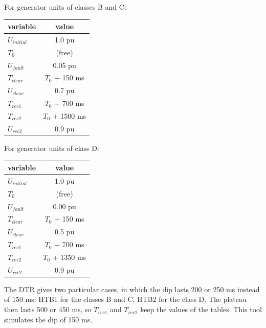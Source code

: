     For generator units of classes B and C:
    \begin{center}
        \begin{tabular}{lc}
            \toprule
            \textbf{variable} & \textbf{value} \\
            \midrule
            $U_{initial}$     & 1.0 pu                   \\
            $T_{0}$           & (free)                   \\
            $U_{fault}$       & 0.05 pu                  \\
            $T_{clear}$       & $T_{0}$ + 150 ms         \\
            $U_{clear}$       & 0.7 pu                   \\
            $T_{rec1}$        & $T_{0}$ + 700 ms         \\
            $T_{rec2}$        & $T_{0}$ + 1500 ms        \\
            $U_{rec2}$        & 0.9 pu                   \\
            \bottomrule
        \end{tabular}
    \end{center}

    For generator units of class D:
    \begin{center}
        \begin{tabular}{lc}
            \toprule
            \textbf{variable} & \textbf{value} \\
            \midrule
            $U_{initial}$     & 1.0 pu                   \\
            $T_{0}$           & (free)                   \\
            $U_{fault}$       & 0.00 pu                  \\
            $T_{clear}$       & $T_{0}$ + 150 ms         \\
            $U_{clear}$       & 0.5 pu                   \\
            $T_{rec1}$        & $T_{0}$ + 700 ms         \\
            $T_{rec2}$        & $T_{0}$ + 1350 ms        \\
            $U_{rec2}$        & 0.9 pu                   \\
            \bottomrule
        \end{tabular}
    \end{center}

    The DTR gives two particular cases, in which the dip lasts 200 or 250 ms instead of
    150 ms: HTB1 for the classes B and C, HTB2 for the class D. The plateau then lasts
    500 or 450 ms, so $T_{rec1}$ and $T_{rec2}$ keep the values of the tables. This tool
    simulates the dip of 150 ms.

